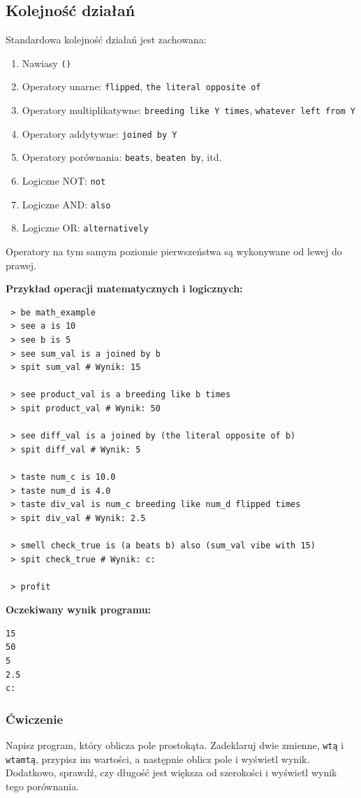 \documentclass[12pt,a4paper]{article}
\begin{document}
\subsection{Kolejność działań}
Standardowa kolejność działań jest zachowana:
\begin{enumerate}
    \item Nawiasy \texttt{()}
    \item Operatory unarne: \texttt{flipped}, \texttt{the literal opposite of}
    \item Operatory multiplikatywne: \texttt{breeding like Y times}, \texttt{whatever left from Y}
    \item Operatory addytywne: \texttt{joined by Y}
    \item Operatory porównania: \texttt{beats}, \texttt{beaten by}, itd.
    \item Logiczne NOT: \texttt{not}
    \item Logiczne AND: \texttt{also}
    \item Logiczne OR: \texttt{alternatively}
\end{enumerate}
Operatory na tym samym poziomie pierwszeństwa są wykonywane od lewej do prawej.

\textbf{Przykład operacji matematycznych i logicznych:}
\begin{lstlisting}
 > be math_example
 > see a is 10
 > see b is 5
 > see sum_val is a joined by b
 > spit sum_val # Wynik: 15

 > see product_val is a breeding like b times
 > spit product_val # Wynik: 50

 > see diff_val is a joined by (the literal opposite of b)
 > spit diff_val # Wynik: 5

 > taste num_c is 10.0
 > taste num_d is 4.0
 > taste div_val is num_c breeding like num_d flipped times
 > spit div_val # Wynik: 2.5

 > smell check_true is (a beats b) also (sum_val vibe with 15)
 > spit check_true # Wynik: c:

 > profit
\end{lstlisting}
\textbf{Oczekiwany wynik programu:}
\begin{verbatim}
15
50
5
2.5
c:
\end{verbatim}

\subsubsection*{Ćwiczenie}
Napisz program, który oblicza pole prostokąta. Zadeklaruj dwie zmienne, \texttt{wtą} i \texttt{wtamtą}, przypisz im wartości, a następnie oblicz pole  i wyświetl wynik. Dodatkowo, sprawdź, czy długość jest większa od szerokości i wyświetl wynik tego porównania.
\end{document}

